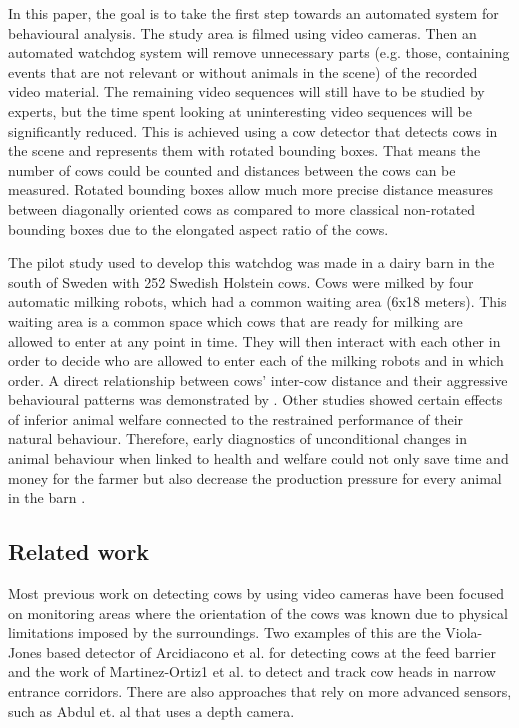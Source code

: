 \documentclass{IET}
\begin{document}
In this paper, the goal is to take the first step towards an automated system for behavioural analysis. The study area is filmed using video cameras. Then an automated watchdog system will remove unnecessary parts (e.g. those, containing events that are not relevant or without animals in the scene) of the recorded video material. The remaining video sequences will still have to be studied by experts, but the time spent looking at uninteresting video sequences will be significantly reduced. This is achieved using a cow detector that detects cows in the scene and represents them with rotated bounding boxes. That means the number of cows could be counted and distances between the cows can be measured. Rotated bounding boxes allow much more precise distance measures between diagonally oriented cows as compared to more classical non-rotated bounding boxes due to the elongated aspect ratio of the cows.

The pilot study used to develop this watchdog was made in a dairy barn in the south of Sweden with 252 Swedish Holstein cows. Cows were milked by four automatic milking robots, which had a common waiting area (6x18 meters). This waiting area is a common space which cows that are ready for milking are allowed to enter at any point in time. They will then interact with each other in order to decide who are allowed to enter each of the milking robots and in which order. A direct relationship between cows' inter-cow distance and their aggressive behavioural patterns was demonstrated by \cite{DeVriesetal2004}. Other studies \cite{Hemsworth2003, Kilgour2012} showed certain effects of inferior animal welfare connected to the restrained performance of their natural behaviour. Therefore, early diagnostics of unconditional changes in animal behaviour when linked to health and welfare could not only save time and money for the farmer but also decrease the production pressure for every animal in the barn \cite{Polikarpusetal2015}.

\subsection{Related work}
Most previous work on detecting cows by using video cameras have been focused on monitoring areas where the orientation of the cows was known due to physical limitations imposed by the surroundings. Two examples of this are the Viola-Jones based detector of Arcidiacono et al. \cite{Arcidiacono2012} for detecting cows at the feed barrier and the work of Martinez-Ortiz1 et al. \cite{martinez2013video} to detect and track cow heads in narrow entrance corridors. There are also approaches that rely on more advanced sensors, such as Abdul et. al \cite{abdul2016locomotion} that uses a depth camera.
\end{document}
